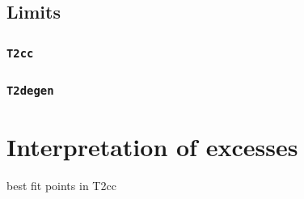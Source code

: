 \subsection{Limits}
\subsubsection{\texttt{T2cc}}
\subsubsection{\texttt{T2degen}}


\section{Interpretation of excesses}
\label{sec:interpretation_excess}
best fit points in T2cc